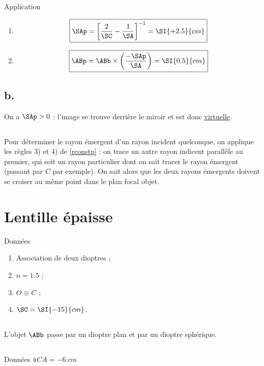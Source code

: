 \documentclass[10pt,notitlepage]{book}
\begin{document}
\begin{NCexem}{Application}
    \begin{enumerate}
        \item \[ \boxed{\SAp = \left[ \frac{2}{\SC}- \frac{1}{\SA}\right]^{-1} =
            \SI{+2.5}{cm}}\]
        \item \[ \boxed{\ABp = \ABb\times \left( \frac{-\SAp}{\SA} \right)
                             = \SI{0.5}{cm}} \]
    \end{enumerate}
\end{NCexem}

\setcounter{subsection}{1}
\subsection{b.}
On a $\SAp > 0$ : l'image se trouve derrière le miroir et est donc
\underline{virtuelle}.

\subsection{}
Pour déterminer le rayon émergent d'un rayon incident quelconque, on applique
les règles 3) et 4) de \ref{rconstp} : on trace un autre rayon indicent
parallèle au premier, qui soit un rayon particulier dont on sait tracer le rayon
émergent (passant par $C$ par exemple). On sait alors que les deux rayons
émergents doivent se croiser au même point dans le plan focal objet.

\section{Lentille épaisse}
\begin{NCdefi}{Données}
    \begin{enumerate}
        \item Association de deux dioptres ;
        \item $n = 1.5$ ;
        \item $O \equiv C$ ;
        \item $\SC = \SI{-15}{cm}$.
    \end{enumerate}
\end{NCdefi}

\subsection{}
L'objet $\ABb$ passe par un dioptre plan et par un dioptre sphérique.

\subsection{}
\begin{NCdefi}{Données}
    $\obar{CA} = \SI{-6}{cm}$
\end{NCdefi}
\end{document}
